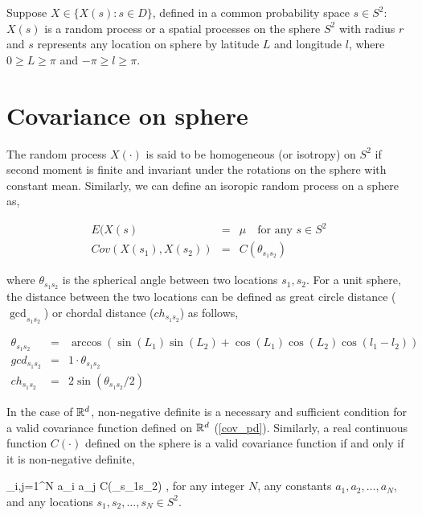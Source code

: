 

Suppose $X \in \{X(s): s\in D\}$, defined in a common probability space $s \in S^2$: $X(s)$ is a random process or a spatial processes on the sphere $S^2$ with radius $r$ and $s$ represents any location on sphere by latitude $L$ and longitude $l$, where $0 \ge L \ge \pi$ and $-\pi \ge l \ge \pi$.\\


\section{Covariance on sphere} 

The random process $X(\cdot)$ is said to be homogeneous (or isotropy) on $S^2$ if second moment is finite and invariant under the rotations on the sphere with constant mean. Similarly, we can define an isoropic random process on a sphere as, 

\begin{eqnarray*}
	E(X(s) &=& \mu \quad \mbox{for any } s\in S^2 \\
	Cov(X(s_1),X(s_2)) &=& C(\theta_{s_1s_2}) 
\end{eqnarray*}

where $\theta_{s_1s_2}$ is the spherical angle between two locations $s_1,s_2$. For a unit sphere, the distance between the two locations can be defined as great circle distance ($\gcd_{s_1s_2}$) or chordal distance ($ch_{s_1s_2}$) as follows,

\begin{eqnarray*}
	\theta_{s_1s_2}  &=& \arccos\left(\sin(L_1)\sin(L_2) + \cos(L_1)\cos(L_2)\cos(l_1-l_2)\right)\\
	gcd_{s_1s_2}    &=&  1\cdot\theta_{s_1s_2}\\
	ch_{s_1s_2}     &=& 2\sin (\theta_{s_1s_2}/2)
\end{eqnarray*}

In the case of $\mathbb{R}^d$, non-negative definite is a necessary and sufficient condition for a valid covariance function defined on $\mathbb{R}^d$ (\ref{cov_pd}). Similarly, a real continuous function $C(\cdot)$ defined on the sphere is a valid covariance function if and only if it is non-negative definite,

\beq
\sum_{i,j=1}^{N} a_i a_j C(\theta_{s_1s_2}) ,
\eeq
for any integer $N$, any constants $a_1, a_2, \ldots, a_N$, and any locations $s_1, s_2, \ldots, s_N \in S^2$.

